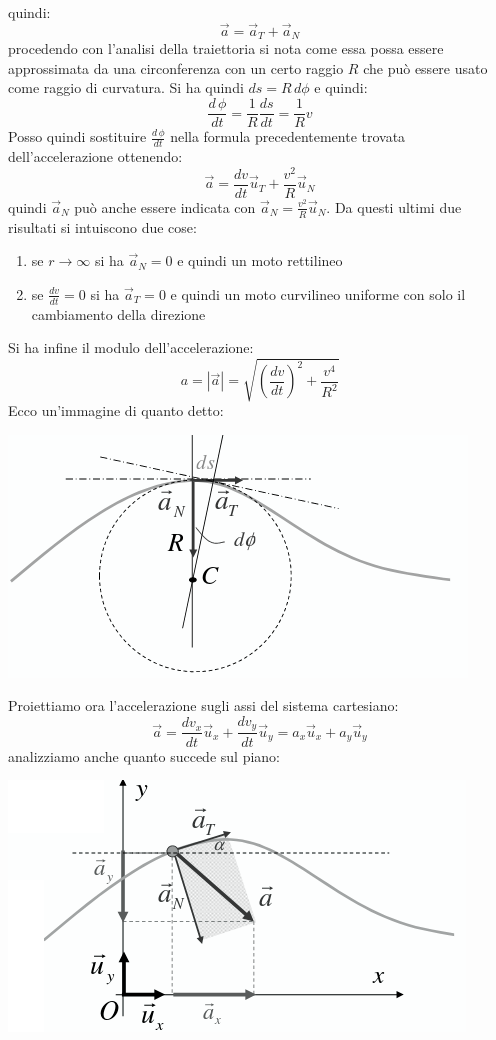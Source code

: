 \documentclass[a4paper,12pt, oneside]{book}
\begin{document}
quindi:
$$\vec{a}=\vec{a}_T+\vec{a}_N$$
procedendo con l'analisi della traiettoria si nota come essa possa essere approssimata da una circonferenza con un certo raggio $R$ che può essere usato come raggio di curvatura. Si ha quindi $ds=R\,d\phi$ e quindi:
$$\frac{d\,\phi}{dt}=\frac{1}{R}\frac{ds}{dt}=\frac{1}{R}v$$
Posso quindi sostituire $\frac{d\,\phi}{dt}$ nella formula precedentemente trovata dell'accelerazione ottenendo:
$$\vec{a}=\frac{dv}{dt}\vec{u}_T+\frac{v^2}{R}\vec{u}_N$$
quindi $\vec{a}_N$ può anche essere indicata con $\vec{a}_N=\frac{v^2}{R}\vec{u}_N$. Da questi ultimi due risultati si intuiscono due cose:
\begin{enumerate}
\item se $r\to\infty$ si ha $\vec{a}_N=0$ e quindi un moto rettilineo
\item se $\frac{dv}{dt}=0$ si ha $\vec{a}_T=0$ e quindi un moto curvilineo uniforme con solo il cambiamento della direzione
\end{enumerate}
Si ha infine il modulo dell'accelerazione:
$$a=|\vec{a}|=\sqrt{\left(\frac{dv}{dt}\right)^2+\frac{v^4}{R^2}}$$
Ecco un'immagine di quanto detto:
\begin{center}
\includegraphics[scale=0.5]{img/pia8.png}
\end{center}
Proiettiamo ora l'accelerazione sugli assi del sistema cartesiano:
$$\vec{a}=\frac{dv_x}{dt}\vec{u}_x+\frac{dv_y}{dt}\vec{u}_y=a_x\vec{u}_x+a_y\vec{u}_y$$
analizziamo anche quanto succede sul piano:
\begin{center}
\includegraphics[scale=0.6]{img/pia9.png}
\end{center}
\end{document}
